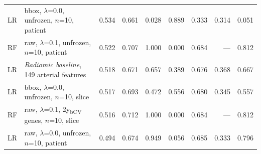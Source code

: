 \documentclass[12pt,twoside]{report}
\begin{document}
\begin{appendices}
\begin{table}[H]
{\begin{tabular}{llrrrrrrr}
LR & bbox, $\lambda$=0.0, unfrozen, $n$=10, patient                   & 0.534 & 0.661 & 0.028 & 0.889 & 0.333 & 0.314 & 0.051 \\
RF & raw, $\lambda$=0.1, unfrozen, $n$=10, patient                    & 0.522 & 0.707 & 1.000 & 0.000 & 0.684 & ---   & 0.812 \\
\hline
LR & \textit{Radiomic baseline}, 149 arterial features                 & 0.518 & 0.671 & 0.657 & 0.389 & 0.676 & 0.368 & 0.667 \\
\hline
LR & bbox, $\lambda$=0.0, unfrozen, $n$=10, slice                     & 0.517 & 0.693 & 0.472 & 0.556 & 0.680 & 0.345 & 0.557 \\
RF & raw, $\lambda$=0.1, 2y\textsubscript{bCV} genes, $n$=10, slice   & 0.516 & 0.712 & 1.000 & 0.000 & 0.684 & ---   & 0.812 \\
LR & raw, $\lambda$=0.0, unfrozen, $n$=10, patient                    & 0.494 & 0.674 & 0.949 & 0.056 & 0.685 & 0.333 & 0.796 \\
\hline
\end{tabular}%
}
\end{table}


\end{appendices}
\end{document}
